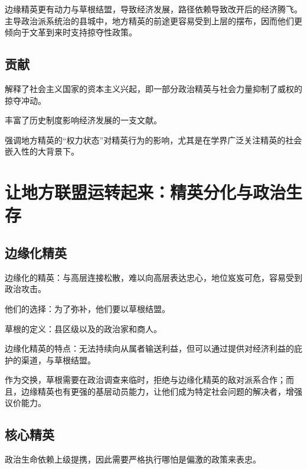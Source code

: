 \documentclass[
]{book}
\begin{document}
边缘精英更有动力与草根结盟，导致经济发展，路径依赖导致改开后的经济腾飞。主导政治派系统治的县城中，地方精英的前途更容易受到上层的摆布，因而他们更倾向于文革到来时支持掠夺性政策。

\hypertarget{ux8d21ux732e}{%
\section{贡献}\label{ux8d21ux732e}}

解释了社会主义国家的资本主义兴起，即一部分政治精英与社会力量抑制了威权的掠夺冲动。

丰富了历史制度影响经济发展的一支文献。

强调地方精英的``权力状态''对精英行为的影响，尤其是在学界广泛关注精英的社会嵌入性的大背景下。

\hypertarget{ux8ba9ux5730ux65b9ux8054ux76dfux8fd0ux8f6cux8d77ux6765ux7cbeux82f1ux5206ux5316ux4e0eux653fux6cbbux751fux5b58}{%
\chapter{让地方联盟运转起来：精英分化与政治生存}\label{ux8ba9ux5730ux65b9ux8054ux76dfux8fd0ux8f6cux8d77ux6765ux7cbeux82f1ux5206ux5316ux4e0eux653fux6cbbux751fux5b58}}

\hypertarget{ux8fb9ux7f18ux5316ux7cbeux82f1}{%
\section{边缘化精英}\label{ux8fb9ux7f18ux5316ux7cbeux82f1}}

边缘化的精英：与高层连接松散，难以向高层表达忠心，地位岌岌可危，容易受到政治攻击。

他们的选择：为了弥补，他们要以草根结盟。

草根的定义：县区级以及的政治家和商人。

边缘化精英的特点：无法持续向从属者输送利益，但可以通过提供对经济利益的庇护的渠道，与草根结盟。

作为交换，草根需要在政治调查来临时，拒绝与边缘化精英的敌对派系合作；而且，边缘精英也有更强的基层动员能力，让他们成为特定社会问题的解决者，增强议价能力。

\hypertarget{ux6838ux5fc3ux7cbeux82f1}{%
\section{核心精英}\label{ux6838ux5fc3ux7cbeux82f1}}

政治生命依赖上级提携，因此需要严格执行哪怕是偏激的政策来表忠。
\end{document}
